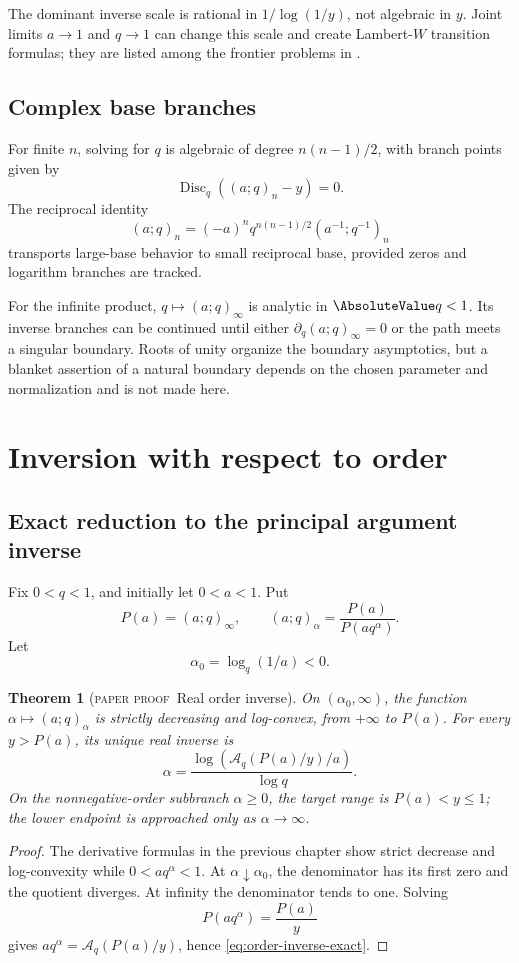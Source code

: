 \documentclass[11pt,oneside]{article}
\newtheorem{theorem}{Theorem}[section]
\theoremstyle{definition}
\theoremstyle{remark}
\theoremstyle{plain}
\theoremstyle{definition}
\theoremstyle{remark}
\newcommand{\Disc}{\operatorname{Disc}}
\newcommand{\Aq}{\mathcal A_q}
\newcommand{\statusproved}{\textcolor{provedgreen}{\textsc{paper proof}}}
\numberwithin{equation}{section}
\numberwithin{figure}{section}
\numberwithin{table}{section}
\let\reporttopsection\section
\let\reportsubsection\subsection
\let\reportsubsubsection\subsubsection
\let\chapter\reporttopsection
\let\section\reportsubsection
\let\subsection\reportsubsubsection
\begin{document}
The dominant inverse scale is rational in \(1/\log(1/y)\), not algebraic in
\(y\).  Joint limits \(a\to1\) and \(q\to1\) can change this scale and create
Lambert-\(W\) transition formulas; they are listed among the frontier problems
in .

\section{Complex base branches}
For finite \(n\), solving for \(q\) is algebraic of degree
\(n(n-1)/2\), with branch points given by
\[
 \Disc_q((a;q)_n-y)=0.
\]
The reciprocal identity
\begin{equation}
 (a;q)_n=(-a)^nq^{n(n-1)/2}(a^{-1};q^{-1})_n
 \label{eq:poch-reciprocal}
\end{equation}
transports large-base behavior to small reciprocal base, provided zeros and
logarithm branches are tracked.

For the infinite product, \(q\mapsto(a;q)_\infty\) is analytic in \(\AbsoluteValue q<1\).
Its inverse branches can be continued until either
\(\partial_q(a;q)_\infty=0\) or the path meets a singular boundary.  Roots of
unity organize the boundary asymptotics, but a blanket assertion of a natural
boundary depends on the chosen parameter and normalization and is not made
here.

\chapter{Inversion with respect to order}

\section{Exact reduction to the principal argument inverse}
Fix \(0<q<1\), and initially let \(0<a<1\).  Put
\[
 P(a)=(a;q)_\infty,
 \qquad
 (a;q)_\alpha=\frac{P(a)}{P(aq^\alpha)}.
\]
Let
\[
 \alpha_0=\log_q(1/a)<0.
\]

\begin{theorem}[\statusproved\ Real order inverse]
On \((\alpha_0,\infty)\), the function
\(\alpha\mapsto(a;q)_\alpha\) is strictly decreasing and log-convex, from
\(+\infty\) to \(P(a)\).  For every \(y>P(a)\), its unique real inverse is
\begin{equation}
 \alpha=
 \frac{\log\!\left(\Aq(P(a)/y)/a\right)}{\log q}.
 \label{eq:order-inverse-exact}
\end{equation}
On the nonnegative-order subbranch \(\alpha\ge0\), the target range is
\(P(a)<y\le1\); the lower endpoint is approached only as
\(\alpha\to\infty\).
\end{theorem}
\begin{proof}
The derivative formulas in the previous chapter show strict decrease and
log-convexity while \(0<aq^\alpha<1\).  At \(\alpha\downarrow\alpha_0\), the
denominator has its first zero and the quotient diverges.  At infinity the
denominator tends to one.  Solving
\[
 P(aq^\alpha)=\frac{P(a)}y
\]
gives \(aq^\alpha=\Aq(P(a)/y)\), hence
\eqref{eq:order-inverse-exact}.
\end{proof}
\end{document}
